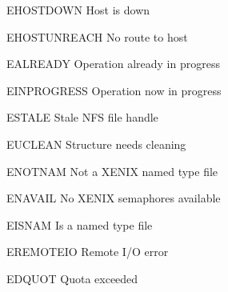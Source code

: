 \begin{datadesc}{EHOSTDOWN} Host is down \end{datadesc}
\begin{datadesc}{EHOSTUNREACH} No route to host \end{datadesc}
\begin{datadesc}{EALREADY} Operation already in progress \end{datadesc}
\begin{datadesc}{EINPROGRESS} Operation now in progress \end{datadesc}
\begin{datadesc}{ESTALE} Stale NFS file handle \end{datadesc}
\begin{datadesc}{EUCLEAN} Structure needs cleaning \end{datadesc}
\begin{datadesc}{ENOTNAM} Not a XENIX named type file \end{datadesc}
\begin{datadesc}{ENAVAIL} No XENIX semaphores available \end{datadesc}
\begin{datadesc}{EISNAM} Is a named type file \end{datadesc}
\begin{datadesc}{EREMOTEIO} Remote I/O error \end{datadesc}
\begin{datadesc}{EDQUOT} Quota exceeded \end{datadesc}

